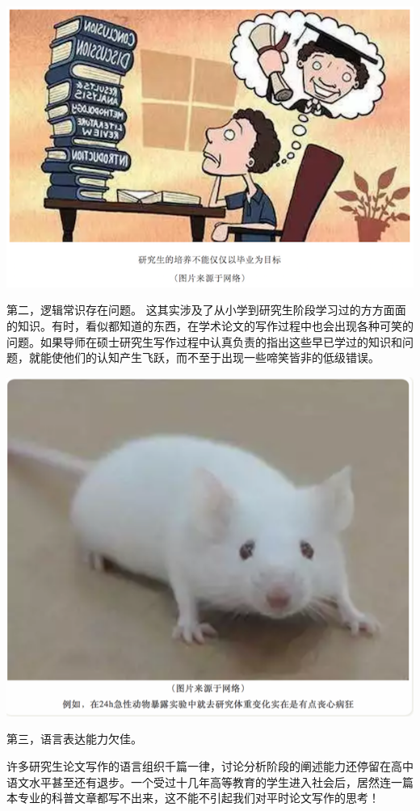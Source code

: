 \documentclass[]{book}
\begin{document}
\includegraphics[width=8.33in]{images/edit3}

第二，逻辑常识存在问题。
这其实涉及了从小学到研究生阶段学习过的方方面面的知识。有时，看似都知道的东西，在学术论文的写作过程中也会出现各种可笑的问题。如果导师在硕士研究生写作过程中认真负责的指出这些早已学过的知识和问题，就能使他们的认知产生飞跃，而不至于出现一些啼笑皆非的低级错误。

\includegraphics[width=8.33in]{images/edit4}

第三，语言表达能力欠佳。

许多研究生论文写作的语言组织千篇一律，讨论分析阶段的阐述能力还停留在高中语文水平甚至还有退步。一个受过十几年高等教育的学生进入社会后，居然连一篇本专业的科普文章都写不出来，这不能不引起我们对平时论文写作的思考！
\end{document}
